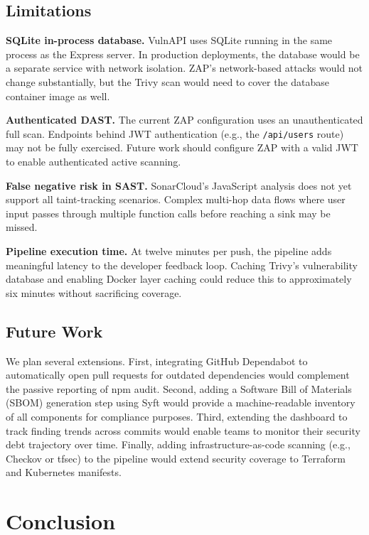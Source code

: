 \documentclass[10pt,conference]{IEEEtran}
\begin{document}
\subsection{Limitations}

\textbf{SQLite in-process database.}
VulnAPI uses SQLite running in the same process as the Express server.
In production deployments, the database would be a separate service with
network isolation.
ZAP's network-based attacks would not change substantially, but the Trivy
scan would need to cover the database container image as well.

\textbf{Authenticated DAST.}
The current ZAP configuration uses an unauthenticated full scan.
Endpoints behind JWT authentication (e.g., the \texttt{/api/users} route) may
not be fully exercised.
Future work should configure ZAP with a valid JWT to enable authenticated
active scanning.

\textbf{False negative risk in SAST.}
SonarCloud's JavaScript analysis does not yet support all taint-tracking
scenarios.
Complex multi-hop data flows where user input passes through multiple function
calls before reaching a sink may be missed.

\textbf{Pipeline execution time.}
At twelve minutes per push, the pipeline adds meaningful latency to the
developer feedback loop.
Caching Trivy's vulnerability database and enabling Docker layer caching
could reduce this to approximately six minutes without sacrificing coverage.

\subsection{Future Work}

We plan several extensions.
First, integrating GitHub Dependabot to automatically open pull requests for
outdated dependencies would complement the passive reporting of npm audit.
Second, adding a Software Bill of Materials (SBOM) generation step using
Syft would provide a machine-readable inventory of all components for
compliance purposes.
Third, extending the dashboard to track finding trends across commits would
enable teams to monitor their security debt trajectory over time.
Finally, adding infrastructure-as-code scanning (e.g., Checkov or tfsec) to
the pipeline would extend security coverage to Terraform and Kubernetes
manifests.

\section{Conclusion}
\end{document}
